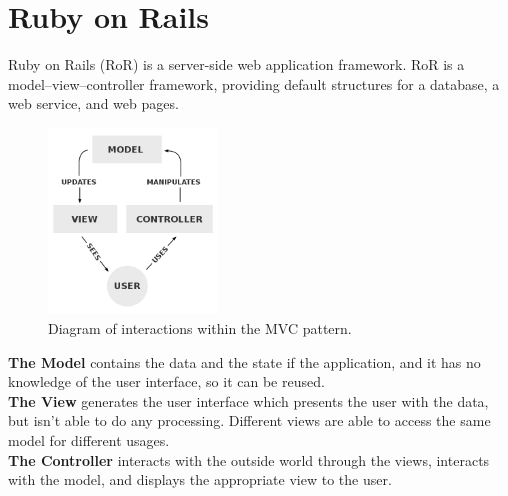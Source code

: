 \section{Ruby on Rails} 
\vspace{-5mm}
Ruby on Rails (RoR) is a server-side web application framework. RoR is a model–view–controller framework, providing default structures for a database, a web service, and web pages.\cite{wiki:RoR}

\begin{figure}[H]
	\centering
    \includegraphics[trim={0 0 0 0},clip,width=0.4\textwidth]{Files/MVC.png}
    \caption{Diagram of interactions within the MVC pattern.\cite{wiki:mvc} }
    \label{fig: MVC}
\end{figure}
\vspace{-3mm}

\textbf{The Model} contains the data and the state if the application, and it has no knowledge of the user interface, so it can be reused.\\
\textbf{The View} generates the user interface which presents the user with the data, but isn't able to do any processing. Different views are able to access the same model for different usages.\\
\textbf{The Controller} interacts with the outside world through the views, interacts with the model, and displays the appropriate view to the user.




